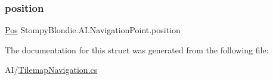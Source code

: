 \mbox{\label{struct_stompy_blondie_1_1_a_i_1_1_navigation_point_a7a6c1f4bdf3a03b0ce91841e757a55c6}} 
\subsubsection{\texorpdfstring{position}{position}}
{\footnotesize\ttfamily \mbox{\hyperlink{struct_stompy_blondie_1_1_common_1_1_types_1_1_pos}{Pos}} Stompy\+Blondie.\+A\+I.\+Navigation\+Point.\+position}



The documentation for this struct was generated from the following file\+:\begin{DoxyCompactItemize}
\item 
A\+I/\mbox{\hyperlink{_tilemap_navigation_8cs}{Tilemap\+Navigation.\+cs}}\end{DoxyCompactItemize}

